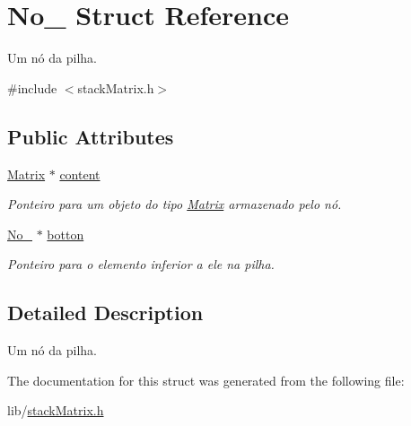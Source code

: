 \hypertarget{struct_no__}{\section{No\-\_\- Struct Reference}
\label{struct_no__}
}


Um nó da pilha.  




{\ttfamily \#include $<$stack\-Matrix.\-h$>$}

\subsection*{Public Attributes}
\begin{DoxyCompactItemize}
\item 
\hypertarget{struct_no___a80653e07ba702dd2d07d3c36de0afad7}{\hyperlink{class_matrix}{Matrix} $\ast$ \hyperlink{struct_no___a80653e07ba702dd2d07d3c36de0afad7}{content}}\label{struct_no___a80653e07ba702dd2d07d3c36de0afad7}

\begin{DoxyCompactList}\small\item\em Ponteiro para um objeto do tipo \hyperlink{class_matrix}{Matrix} armazenado pelo nó. \end{DoxyCompactList}\item 
\hypertarget{struct_no___aa4157820bc470031c38679867ee9468b}{\hyperlink{struct_no__}{No\-\_\-} $\ast$ \hyperlink{struct_no___aa4157820bc470031c38679867ee9468b}{botton}}\label{struct_no___aa4157820bc470031c38679867ee9468b}

\begin{DoxyCompactList}\small\item\em Ponteiro para o elemento inferior a ele na pilha. \end{DoxyCompactList}\end{DoxyCompactItemize}


\subsection{Detailed Description}
Um nó da pilha. 

The documentation for this struct was generated from the following file\-:\begin{DoxyCompactItemize}
\item 
lib/\hyperlink{stack_matrix_8h}{stack\-Matrix.\-h}\end{DoxyCompactItemize}

